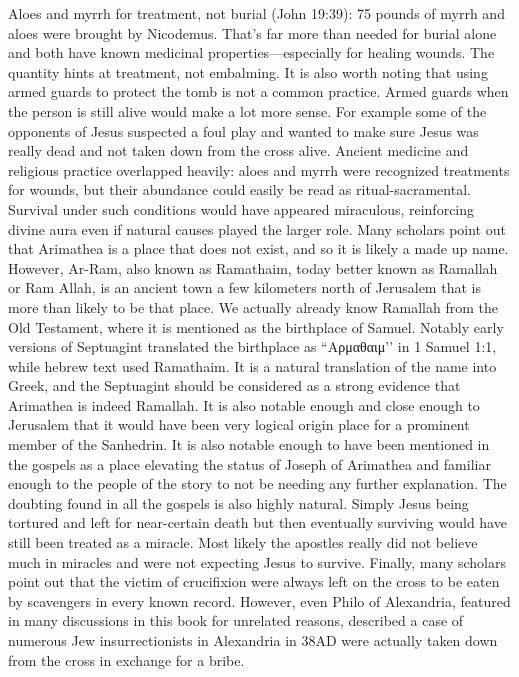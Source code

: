 Aloes and myrrh for treatment, not burial (John 19:39): 75 pounds of myrrh and aloes were brought by Nicodemus.
That’s far more than needed for burial alone and both have known medicinal properties—especially for healing wounds.
The quantity hints at treatment, not embalming.
It is also worth noting that using armed guards to protect the tomb is not a common practice.
Armed guards when the person is still alive would make a lot more sense.
For example some of the opponents of Jesus suspected a foul play and wanted to make sure Jesus was really dead and not taken down from the cross alive.
Ancient medicine and religious practice overlapped heavily: aloes and myrrh were recognized treatments for wounds, but their abundance could easily be read as ritual-sacramental. Survival under such conditions would have appeared miraculous, reinforcing divine aura even if natural causes played the larger role.
Many scholars point out that Arimathea is a place that does not exist, and so it is likely a made up name.
However, Ar-Ram, also known as Ramathaim, today better known as Ramallah or Ram Allah, is an ancient town a few kilometers north of Jerusalem that is more than likely to be that place.
We actually already know Ramallah from the Old Testament, where it is mentioned as the birthplace of Samuel.
Notably early versions of Septuagint translated the birthplace as ``Αρμαθαιμ’’ in 1 Samuel 1:1, while hebrew text used Ramathaim.
It is a natural translation of the name into Greek, and the Septuagint should be considered as a strong evidence that Arimathea is indeed Ramallah.
It is also notable enough and close enough to Jerusalem that it would have been very logical origin place for a prominent member of the Sanhedrin.
It is also notable enough to have been mentioned in the gospels as a place elevating the status of Joseph of Arimathea and familiar enough to the people of the story to not be needing any further explanation.
The doubting found in all the gospels is also highly natural.
Simply Jesus being tortured and left for near-certain death but then eventually surviving would have still been treated as a miracle.
Most likely the apostles really did not believe much in miracles and were not expecting Jesus to survive.
Finally, many scholars point out that the victim of crucifixion were always left on the cross to be eaten by scavengers in every known record.
However, even Philo of Alexandria, featured in many discussions in this book for unrelated reasons, described a case of numerous Jew insurrectionists in Alexandria in 38AD were actually taken down from the cross in exchange for a bribe.
